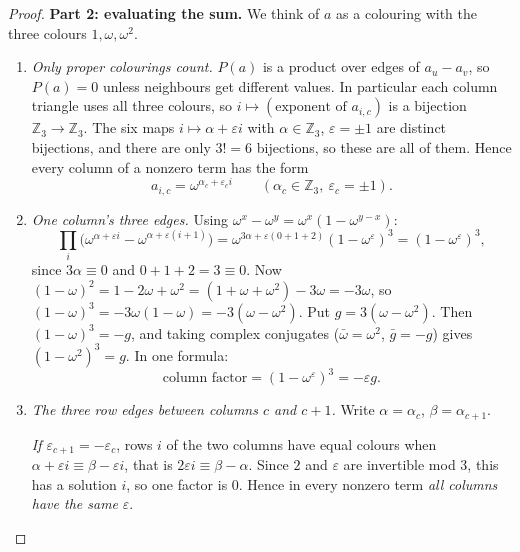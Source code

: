 \documentclass[11pt,oneside,openany]{book}
\newenvironment{steps}[1][]{\begin{enumerate}[label=\textbf{Step \arabic*.},leftmargin=4.2em,itemsep=0.3em,#1]}{\end{enumerate}}
\newcommand{\Z}{\mathbb{Z}}
\begin{document}
\begin{proof}
\textbf{Part 2: evaluating the sum.} We think of $a$ as a colouring with the three colours $1, \omega, \omega^2$.
\begin{steps}[start=4]
\item \emph{Only proper colourings count.} $P(a)$ is a product over edges of $a_u - a_v$, so $P(a) = 0$ unless
neighbours get different values. In particular each column triangle uses all three colours, so
$i \mapsto (\text{exponent of } a_{i,c})$ is a bijection $\Z_3 \to \Z_3$. The six maps $i \mapsto \alpha + \varepsilon i$ with
$\alpha \in \Z_3$, $\varepsilon = \pm 1$ are distinct bijections, and there are only $3! = 6$ bijections, so these are all of
them. Hence every column of a nonzero term has the form
\[ a_{i,c} = \omega^{\alpha_c + \varepsilon_c i} \qquad (\alpha_c \in \Z_3,\ \varepsilon_c = \pm 1). \]
\item \emph{One column's three edges.} Using $\omega^{x} - \omega^{y} = \omega^{x}(1 - \omega^{y - x})$:
\[ \prod_{i} \big(\omega^{\alpha + \varepsilon i} - \omega^{\alpha + \varepsilon(i+1)}\big)
 = \omega^{3\alpha + \varepsilon(0 + 1 + 2)} (1 - \omega^{\varepsilon})^3 = (1 - \omega^{\varepsilon})^3, \]
since $3\alpha \equiv 0$ and $0 + 1 + 2 = 3 \equiv 0$. Now
$(1 - \omega)^2 = 1 - 2\omega + \omega^2 = (1 + \omega + \omega^2) - 3\omega = -3\omega$, so
$(1 - \omega)^3 = -3\omega(1 - \omega) = -3(\omega - \omega^2)$. Put $g = 3(\omega - \omega^2)$. Then $(1 - \omega)^3 = -g$, and
taking complex conjugates ($\bar\omega = \omega^2$, $\bar g = -g$) gives $(1 - \omega^2)^3 = g$. In one formula:
\[ \text{column factor} = (1 - \omega^{\varepsilon})^3 = -\varepsilon g. \]
\item \emph{The three row edges between columns $c$ and $c+1$.} Write $\alpha = \alpha_c$, $\beta = \alpha_{c+1}$.

\emph{If $\varepsilon_{c+1} = -\varepsilon_c$}, rows $i$ of the two columns have equal colours when
$\alpha + \varepsilon i \equiv \beta - \varepsilon i$, that is $2\varepsilon i \equiv \beta - \alpha$. Since $2$ and $\varepsilon$ are invertible mod 3,
this has a solution $i$, so one factor is $0$. Hence in every nonzero term \emph{all columns have the same}
$\varepsilon$.


\end{steps}
\end{proof}
\end{document}
